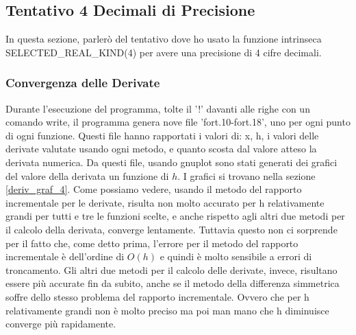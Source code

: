 \documentclass[a4paper]{article}
\begin{document}
{\subsection{Tentativo 4 Decimali di Precisione}
In questa sezione, parlerò del tentativo dove ho usato la funzione intrinseca SELECTED\_REAL\_KIND(4) per avere una precisione di 4 cifre decimali.
\subsubsection{Convergenza delle Derivate}
Durante l'esecuzione del programma, tolte il '!' davanti alle righe con un comando write, il programma genera nove file 'fort.10-fort.18', uno per ogni punto di ogni funzione. Questi file hanno rapportati i valori di: x, h, i valori delle derivate valutate usando ogni metodo, e quanto scosta dal valore atteso la derivata numerica. Da questi file, usando gnuplot sono stati generati dei grafici del valore della derivata un funzione di $h$. I grafici si trovano nella sezione \ref{deriv_graf_4}. Come possiamo vedere, usando il metodo del rapporto incrementale per le derivate, risulta non molto accurato per h relativamente grandi per tutti e tre le funzioni scelte, e anche rispetto agli altri due metodi per il calcolo della derivata, converge lentamente. Tuttavia questo non ci sorprende per il fatto che, come detto prima, l'errore per il metodo del rapporto incrementale è dell'ordine di $O(h)$ e quindi è molto sensibile a errori di troncamento. Gli altri due metodi per il calcolo delle derivate, invece, risultano essere più accurate fin da subito, anche se il metodo della differenza simmetrica soffre dello stesso problema del rapporto incrementale. Ovvero che per h relativamente grandi non è molto preciso ma poi man mano che h diminuisce converge più rapidamente. 

}
\end{document}
